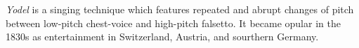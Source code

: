 \emph{Yodel} is a singing technique which features repeated and abrupt changes of pitch between low-pitch chest-voice and high-pitch falsetto.
It became opular in the 1830s as entertainment in Switzerland, Austria, and sourthern Germany.
